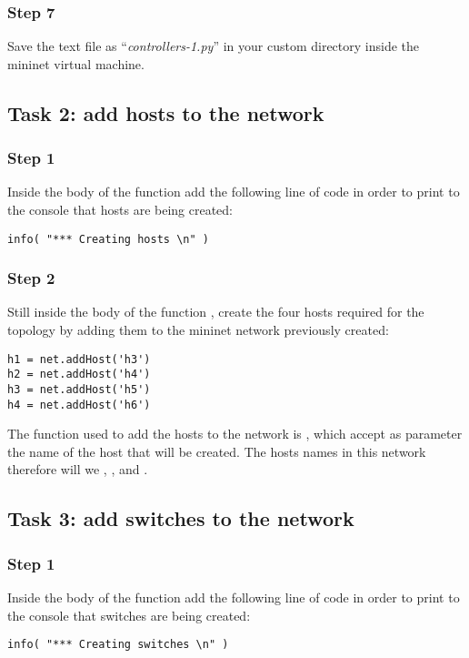 \subsubsection*{Step 7}
Save the text file as ``\emph{controllers-1.py}'' in your custom directory inside
the mininet virtual machine.





\subsection*{Task 2: add hosts to the network}
\subsubsection*{Step 1}
Inside the body of the function  add the following line
of code in order to print to the console that hosts are being created:
\begin{lstlisting}
info( "*** Creating hosts \n" )
\end{lstlisting}

\subsubsection*{Step 2}
Still inside the body of the function , create the
four hosts required for the topology by adding them to the mininet network
previously created:
\begin{lstlisting}
h1 = net.addHost('h3')
h2 = net.addHost('h4')
h3 = net.addHost('h5')
h4 = net.addHost('h6')
\end{lstlisting}
The function used to add the hosts to the network is , which
accept as parameter the name of the host that will be created. The hosts names in
this network therefore will we , ,  and .





\subsection*{Task 3: add switches to the network}
\subsubsection*{Step 1}
Inside the body of the function  add the following line
of code in order to print to the console that switches are being created:
\begin{lstlisting}
info( "*** Creating switches \n" )
\end{lstlisting}

